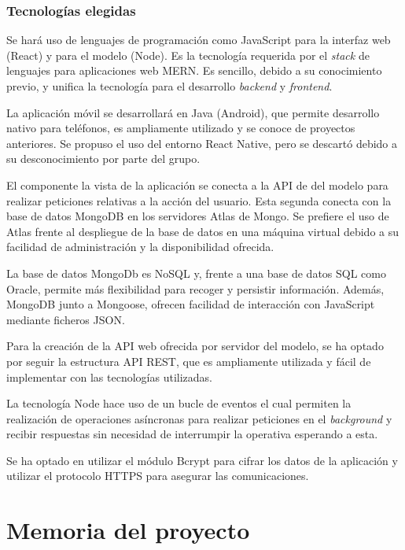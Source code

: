 \documentclass{article}
\begin{document}
\subsubsection*{Tecnologías elegidas}

Se hará uso de lenguajes de programación como JavaScript para la interfaz web (React) y para el modelo (Node). Es la tecnología requerida por el \textit{stack} de lenguajes para aplicaciones web MERN. Es sencillo, debido a su conocimiento previo, y unifica la tecnología para el desarrollo \textit{backend} y \textit{frontend}.

La aplicación móvil se desarrollará en Java (Android), que permite desarrollo nativo para teléfonos, es ampliamente utilizado y se conoce de proyectos anteriores. Se propuso el uso del entorno React Native, pero se descartó debido a su desconocimiento por parte del grupo.

El componente la vista de la aplicación se conecta a la API de del modelo para realizar peticiones relativas a la acción del usuario. Esta segunda conecta con la base de datos MongoDB en los servidores Atlas de Mongo. Se prefiere el uso de Atlas frente al despliegue de la base de datos en una máquina virtual debido a su facilidad de administración y la disponibilidad ofrecida. 

\pagebreak

La base de datos MongoDb es NoSQL y, frente a una base de datos SQL como Oracle, permite más flexibilidad para recoger y persistir información. Además, MongoDB junto a Mongoose, ofrecen facilidad de interacción con JavaScript mediante ficheros JSON.

Para la creación de la API web ofrecida por servidor del modelo, se ha optado por seguir la estructura API REST, que es ampliamente utilizada y fácil de implementar con las tecnologías utilizadas. 

La tecnología Node hace uso de un bucle de eventos el cual permiten la realización de operaciones asíncronas para realizar peticiones en el \textit{background} y recibir respuestas sin necesidad de interrumpir la operativa esperando a esta.

Se ha optado en utilizar el módulo Bcrypt para cifrar los datos de la aplicación y utilizar el protocolo HTTPS para asegurar las comunicaciones. 

\pagebreak

\section{Memoria del proyecto}
\end{document}
